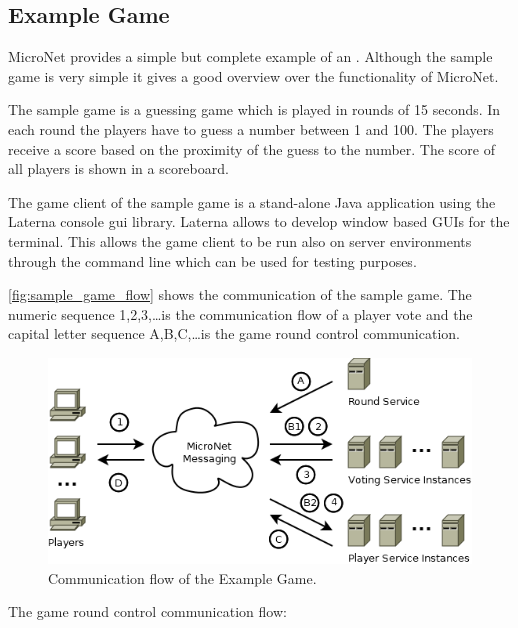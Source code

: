 \subsection{Example Game}
\label{sub:example_game}

MicroNet provides a simple but complete example of an \og{}. Although the sample
game is very simple it gives a good overview over the functionality of MicroNet.

The sample game is a guessing game which is played in rounds of 15 seconds.
In each round the players have to guess a number between 1 and 100. The players
receive a score based on the proximity of the guess to the number. The score of
all players is shown in a scoreboard. 

The game client of the sample game is a stand-alone Java application using the
Laterna console gui library. Laterna allows to develop window based GUIs for the
terminal. This allows the game client to be run also on server environments
through the command line which can be used for testing purposes.


\autoref{fig:sample_game_flow} shows the communication of the sample game. The
numeric sequence 1,2,3,\ldots is the communication flow of a player vote and the
capital letter sequence A,B,C,\ldots is the game round control communication.\\

\begin{figure}
	\centering
	\includegraphics[width=\textwidth]{images/architecture/SampleGame}
	\caption{Communication flow of the Example Game.}
	\label{fig:sample_game_flow}
\end{figure}

\noindent
The game round control communication flow:

